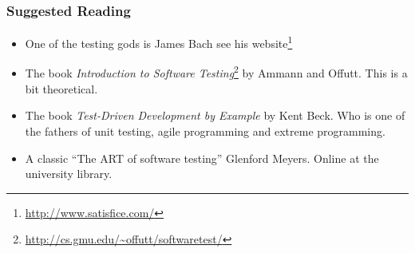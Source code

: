 \documentclass[handout]{beamer}
\begin{document}
%
\begin{frame}
  \frametitle{Suggested Reading}
  \begin{itemize}
  \item One of the testing gods is James Bach see his
    website\footnote{\url{http://www.satisfice.com/}}
  \item The book {\em Introduction to Software
      Testing}\footnote{\url{http://cs.gmu.edu/~offutt/softwaretest/}}
    by Ammann and Offutt. This is a bit theoretical. 
  \item The book {\em Test-Driven Development by Example} by Kent Beck.
    Who is one of the  fathers of unit testing, agile programming  and
    extreme programming. 
    \item A classic ``The ART of software testing'' Glenford Meyers.  Online
      at the university library. 
  \end{itemize}
\end{frame}
\end{document}
